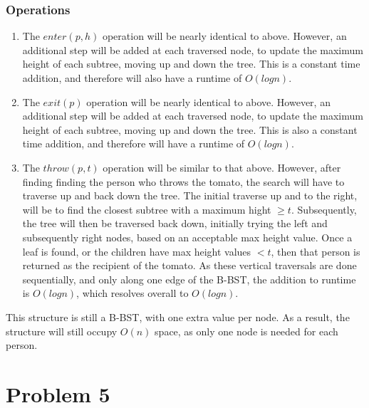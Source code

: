\documentclass{article}
\begin{document}
\subsubsection{Operations}
\begin{enumerate}
    \item The $enter(p, h)$ operation will be nearly identical to above.
        However, an additional step will be added at each traversed node,
        to update the maximum height of each subtree, moving up and down the tree.
        This is a constant time addition, and therefore will also have a runtime of $O(log n)$.
    \item The $exit(p)$ operation will be nearly identical to above.
        However, an additional step will be added at each traversed node,
        to update the maximum height of each subtree, moving up and down the tree.
        This is also a constant time addition, and therefore will have a runtime of $O(log n)$.
    \item The $throw(p, t)$ operation will be similar to that above.
        However, after finding finding the person who throws the tomato,
        the search will have to traverse up and back down the tree.
        The initial traverse up and to the right, will be to find the closest subtree
        with a maximum hight $\geq t$.
        Subsequently, the tree will then be traversed back down, initially trying the left
        and subsequently right nodes, based on an acceptable max height value.
        Once a leaf is found, or the children have max height values $< t$, then that person
        is returned as the recipient of the tomato.
        As these vertical traversals are done sequentially, and only along one edge of the B-BST,
        the addition to runtime is $O(log n)$, which resolves overall to $O(log n)$.
\end{enumerate}

This structure is still a B-BST, with one extra value per node.
As a result, the structure will still occupy $O(n)$ space, as only one node is needed for each person.

\section{Problem 5}
\end{document}
